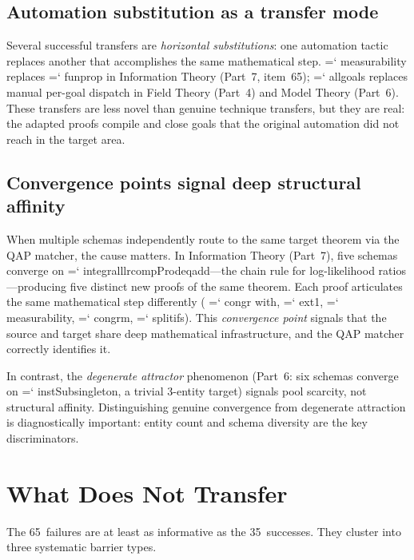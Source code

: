 \documentclass[11pt]{article}
\renewcommand{\texttt}[1]{%
  \begingroup\ttfamily\hyphenchar\font=`\-\relax
  \def\_{\textunderscore\discretionary{}{}{}}%
  #1\endgroup}
\theoremstyle{definition}
\theoremstyle{remark}
\begin{document}
\subsection{Automation substitution as a transfer mode}

Several successful transfers are \emph{horizontal substitutions}:
one automation tactic replaces another that accomplishes the same
mathematical step.  \texttt{measurability} replaces
\texttt{fun\_prop} in Information Theory (Part~7, item~65);
\texttt{all\_goals} replaces manual per-goal dispatch in Field
Theory (Part~4) and Model Theory (Part~6).  These transfers are
less novel than genuine technique transfers, but they are real: the
adapted proofs compile and close goals that the original
automation did not reach in the target area.

\subsection{Convergence points signal deep structural affinity}

When multiple schemas independently route to the same target
theorem via the QAP matcher, the cause matters.  In Information
Theory (Part~7), five schemas converge on
\texttt{integral\_llr\_compProd\_eq\_add}---the chain rule for
log-likelihood ratios---producing five distinct new proofs of the
same theorem.  Each proof articulates the same mathematical step
differently (\texttt{congr with}, \texttt{ext1},
\texttt{measurability}, \texttt{congrm}, \texttt{split\_ifs}).
This \emph{convergence point} signals that the source and target
share deep mathematical infrastructure, and the QAP matcher
correctly identifies it.

In contrast, the \emph{degenerate attractor} phenomenon (Part~6:
six schemas converge on \texttt{instSubsingleton}, a trivial
3-entity target) signals pool scarcity, not structural affinity.
Distinguishing genuine convergence from degenerate attraction is
diagnostically important: entity count and schema diversity are the
key discriminators.

\section{What Does Not Transfer}\label{sec:barriers}

The 65~failures are at least as informative as the 35~successes.
They cluster into three systematic barrier types.
\end{document}
